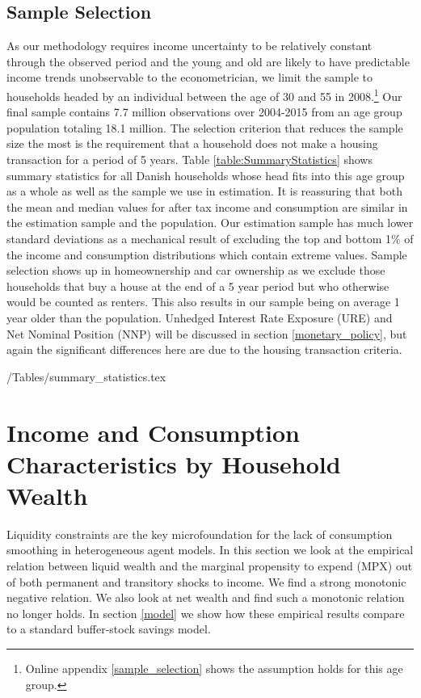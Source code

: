 \documentclass[titlepage]{\econtex}\newcommand{\texname}{ConsumptionHeterogeneity}
\begin{document}
\subsection{Sample Selection}
As our methodology requires income uncertainty to be relatively constant through the observed period and the young and old are likely to have predictable income trends unobservable to the econometrician, we limit the sample to households headed by an individual between the age of 30 and 55 in 2008.\footnote{Online appendix \ref{sample_selection} shows the assumption holds for this age group.} Our final sample contains 7.7 million observations over 2004-2015 from an age group population totaling 18.1 million. The selection criterion that reduces the sample size the most is the requirement that a household does not make a housing transaction for a period of 5 years. Table \ref{table:SummaryStatistics} shows summary statistics for all Danish households whose head fits into this age group as a whole as well as the sample we use in estimation. It is reassuring that both the mean and median values for after tax income and consumption are similar in the estimation sample and the population. Our estimation sample has much lower standard deviations as a mechanical result of excluding the top and bottom 1\% of the income and consumption distributions which contain extreme values. Sample selection shows up in homeownership and car ownership as we exclude those households that buy a house at the end of a 5 year period but who otherwise would be counted as renters. This also results in our sample being on average 1 year older than the population. Unhedged Interest Rate Exposure (URE) and Net Nominal Position (NNP) will be discussed in section \ref{monetary_policy}, but again the significant differences here are due to the housing transaction criteria. 
\begin{center} 
	\label{table:SummaryStatistics}
	\econtexRoot/Tables/summary_statistics.tex 
\end{center}

\section{Income and Consumption Characteristics by Household Wealth} \label{MPX_wealth}
Liquidity constraints are the key microfoundation for the lack of consumption smoothing in heterogeneous agent models. In this section we look at the empirical relation between liquid wealth and the marginal propensity to expend (MPX) out of both permanent and transitory shocks to income. We find a strong monotonic negative relation. We also look at net wealth and find such a monotonic relation no longer holds. In section \ref{model} we show how these empirical results compare to a standard buffer-stock savings model.
\end{document}
